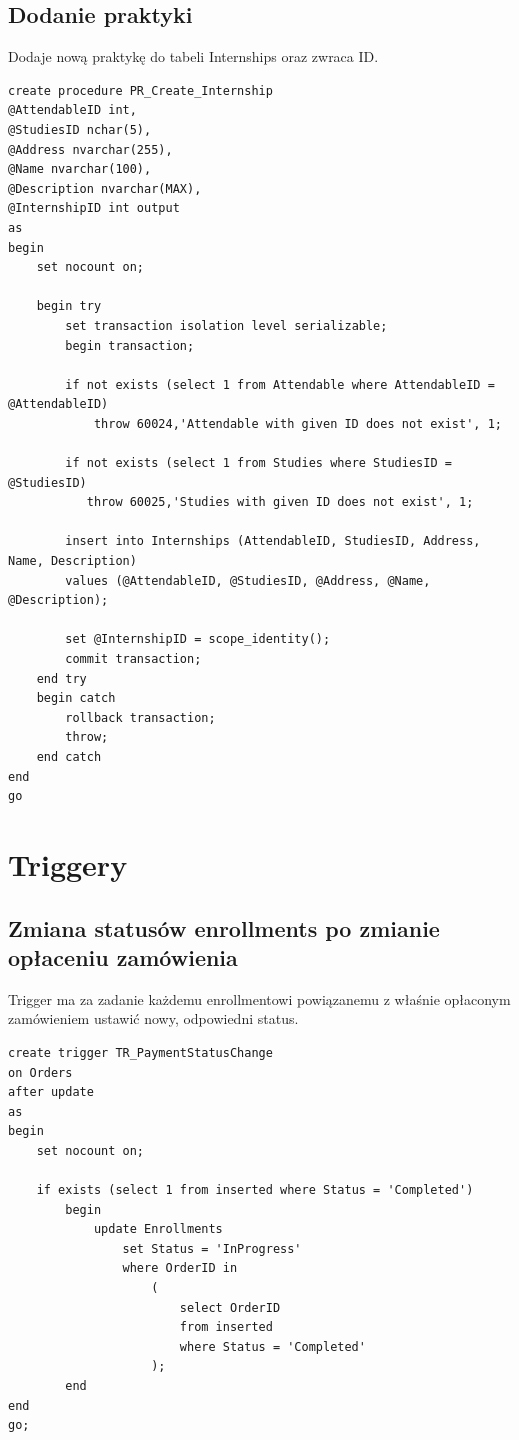 \documentclass[11pt,a4paper]{article}
\begin{document}
\subsection{Dodanie praktyki}
Dodaje nową praktykę do tabeli Internships oraz zwraca ID.
\begin{Verbatim}[breaklines=true]
create procedure PR_Create_Internship
@AttendableID int,
@StudiesID nchar(5),
@Address nvarchar(255),
@Name nvarchar(100),
@Description nvarchar(MAX),
@InternshipID int output
as
begin
    set nocount on;

    begin try
        set transaction isolation level serializable;
        begin transaction;
        
        if not exists (select 1 from Attendable where AttendableID = @AttendableID)
            throw 60024,'Attendable with given ID does not exist', 1;

        if not exists (select 1 from Studies where StudiesID = @StudiesID)
           throw 60025,'Studies with given ID does not exist', 1;

        insert into Internships (AttendableID, StudiesID, Address, Name, Description)
        values (@AttendableID, @StudiesID, @Address, @Name, @Description);

        set @InternshipID = scope_identity();
        commit transaction;
    end try
    begin catch
        rollback transaction;
        throw;
    end catch
end
go
\end{Verbatim}

\section{Triggery}

\subsection{Zmiana statusów enrollments po zmianie opłaceniu zamówienia}
Trigger ma za zadanie każdemu enrollmentowi powiązanemu z właśnie opłaconym zamówieniem ustawić nowy, odpowiedni status. 
\begin{Verbatim}[breaklines=true]
create trigger TR_PaymentStatusChange
on Orders
after update
as
begin
    set nocount on;

    if exists (select 1 from inserted where Status = 'Completed')
        begin
            update Enrollments
                set Status = 'InProgress'
                where OrderID in 
                    (
                        select OrderID 
                        from inserted 
                        where Status = 'Completed'
                    );
        end
end
go;
\end{Verbatim}
\end{document}
